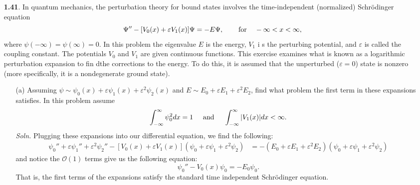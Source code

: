 \documentclass{article}
\begin{document}
\begin{itemize}
    \item[\textbf{1.41}.] In quantum mechanics, the perturbation theory for bound states involves the time-independent (normalized) Schr{\"o}dinger equation
    \[\Psi'' - [V_0(x) + \varepsilon V_1(x)]\Psi = -E\Psi, \hspace{0.75cm} \text{for} \hspace{0.4cm} -\infty < x < \infty,\]
    where $\psi(-\infty) = \psi(\infty) = 0$. In this problem the eigenvalue $E$ is the energy, $V_1$ i s the perturbing potential, and $\varepsilon$ is called the coupling constant. The potentials $V_0$ and $V_1$ are given continuous functions. This exercise examines what is known as a logarithmic perturbation expansion to fin dthe corrections to the energy. To do this, it is assumed that the unperturbed ($\varepsilon = 0$) state is nonzero (more specifically, it is a nondegenerate ground state).
    \begin{itemize}
        \item[(a)] Assuming $\psi \sim \psi_0(x) + \varepsilon \psi_1(x) + \varepsilon^2\psi_2(x)$ and $E \sim E_0 + \varepsilon E_1 + \varepsilon^2E_2$, find what problem the first term in these expansions satisfies. In this problem assume 
        \[\int_{-\infty}^{\infty} \psi_0^2dx = 1 \hspace{0.5cm} \text{and} \hspace{0.5cm} \int_{-\infty}^{\infty}|V_1(x)|dx < \infty.\]
        \textit{Soln.} Plugging these expansions into our differential equation, we find the following:
        \begin{align*}
            \psi_0'' + \varepsilon\psi_1'' + \varepsilon^2\psi_2'' - [V_0(x) + \varepsilon V_1(x)](\psi_0 + \varepsilon\psi_1 + \varepsilon^2\psi_2) &= -(E_0 + \varepsilon E_1 + \varepsilon^2E_2)(\psi_0+ \varepsilon\psi_1 + \varepsilon^2\psi_2)
        \end{align*}
        and notice the $\mathcal{O}(1)$ terms give us the following equation:
        \[\psi_0'' - V_0(x)\psi_0 = -E_0\psi_0.\]
        That is, the first terms of the expansions satisfy the standard time independent Schr{\"o}dinger equation.
        \newline\newline
        



\end{itemize}
\end{itemize}
\end{document}
